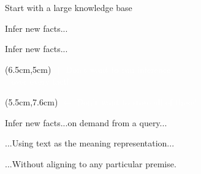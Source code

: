 \begin{frame}[noframenumbering]{Start with a large knowledge base}
\begin{center}
  \teaserManyPremises
\end{center}
\end{frame}

\begin{frame}[noframenumbering]{Infer new facts...}
\begin{center}
  \teaserBlindInferenceNaturalOrderBlind
\end{center}
\end{frame}

\begin{frame}[noframenumbering]{Infer new facts...}
\begin{center}
  \teaserBlindInferenceNaturalOrder
\end{center}
\pause
\begin{textblock*}{6.0cm}(6.5cm,5cm)
  \textcolor<1-1>{white}{$\uparrow$ Don't want to run inference \\ $~~$ over every fact!}
\end{textblock*}
\pause
\begin{textblock*}{6cm}(5.5cm,7.6cm)
  \textcolor<1-2>{white}{$\leftarrow$ Don't want to store all of these!}
\end{textblock*}
\end{frame}

\begin{frame}[noframenumbering]{Infer new facts...on demand from a query...}
\begin{center}
  \teaserBlindInference
\end{center}
\end{frame}

\begin{frame}[noframenumbering]{...Using text as the meaning representation...}
\begin{center}
  \teaserInference
\end{center}
\end{frame}

\begin{frame}[noframenumbering]{...Without aligning to any particular premise.}
\begin{center}
  \teaserFullDerivation
\end{center}
\end{frame}


